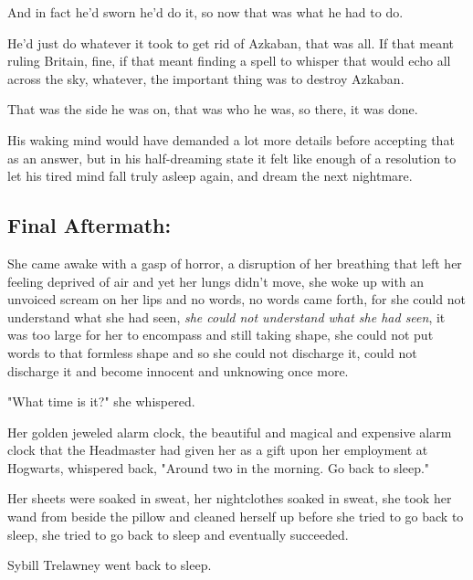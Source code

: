 And in fact he'd sworn he'd do it, so now that was what he had to do.

He'd just do whatever it took to get rid of Azkaban, that was all. If that 
meant ruling Britain, fine, if that meant finding a spell to whisper that would 
echo all across the sky, whatever, the important thing was to destroy Azkaban.

That was the side he was on, that was who he was, so there, it was done.

His waking mind would have demanded a lot more details before accepting that as 
an answer, but in his half-dreaming state it felt like enough of a resolution 
to let his tired mind fall truly asleep again, and dream the next nightmare.
\sbreak
\vspace{-2\baselineskip}
\subsection{Final Aftermath:}

She came awake with a gasp of horror, a disruption of her breathing that left 
her feeling deprived of air and yet her lungs didn't move, she woke up with an 
unvoiced scream on her lips and no words, no words came forth, for she could 
not understand what she had seen, \emph{she could not understand what she had 
seen}, it was too large for her to encompass and still taking shape, she could 
not put words to that formless shape and so she could not discharge it, could 
not discharge it and become innocent and unknowing once more.

"What time is it?" she whispered.

Her golden jeweled alarm clock, the beautiful and magical and expensive alarm 
clock that the Headmaster had given her as a gift upon her employment at 
Hogwarts, whispered back, "Around two in the morning. Go back to sleep."

Her sheets were soaked in sweat, her nightclothes soaked in sweat, she took her 
wand from beside the pillow and cleaned herself up before she tried to go back 
to sleep, she tried to go back to sleep and eventually succeeded.

Sybill Trelawney went back to sleep.
